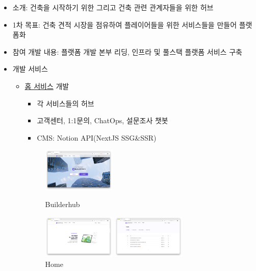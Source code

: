 
\begin{itemize}
\item 소개: 건축을 시작하기 위한 그리고 건축 관련 관계자들을 위한 허브
\item 1차 목표: 건축 견적 시장을 점유하여 플레이어들을 위한 서비스들을 만들어 플랫폼화
\item 참여 개발 내용: 플랫폼 개발 본부 리딩, 인프라 및 풀스택 플랫폼 서비스 구축
\item 개발 서비스
\begin{itemize}[label=$\star$]
	\item \href{https://builderhub.io}{홈 서비스} 개발
	      \begin{itemize}
		      \item 각 서비스들의 허브
		      \item 고객센터, 1:1문의, ChatOps, 설문조사 챗봇
		      \item CMS: Notion API(NextJS SSG\&SSR)
	      \end{itemize}
	      \begin{figure}[!ht]
		      \begin{fullwidth}
			      \parbox{0.35\textwidth}{
				      \centering
				      \includegraphics[width=0.35\textwidth]{images/builderhub-home-1.png}
				      \caption*{Builderhub}
			      }\qquad
			      \parbox{0.35\textwidth}{
				      \centering
				      \includegraphics[width=0.35\textwidth]{images/builderhub-home-2.png}
				      \caption*{Home}
			      }\qquad
			      \parbox{0.35\textwidth}{
				      \centering
				      \includegraphics[width=0.35\textwidth]{images/builderhub-home-cs-1.png}
}
\end{fullwidth}
\end{figure}
\end{itemize}
\end{itemize}
